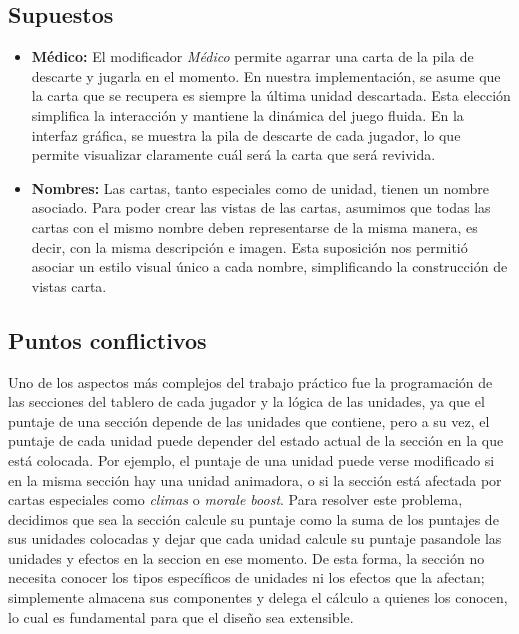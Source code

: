 \documentclass[titlepage,a4paper]{article}
\begin{document}
	\subsection{Supuestos}\label{sup:intro}
	\begin{itemize}
		\item \textbf{Médico:} El modificador \textit{Médico} permite agarrar una carta de la pila de descarte y jugarla en el momento.
		En nuestra implementación, se asume que la carta que se recupera es siempre la última unidad descartada. Esta elección simplifica la interacción y mantiene la dinámica del juego fluida. En la interfaz gráfica, se muestra la pila de descarte de cada jugador, lo que permite visualizar claramente cuál será la carta que será revivida.

		\item \textbf{Nombres:} Las cartas, tanto especiales como de unidad, tienen un nombre asociado. Para poder crear las vistas de las cartas, asumimos que todas las cartas con el mismo nombre deben representarse de la misma manera, es decir, con la misma descripción e imagen. Esta suposición nos permitió asociar un estilo visual único a cada nombre, simplificando la construcción de vistas carta.

	\end{itemize}

	\subsection{Puntos conflictivos}\label{sup:conflicto}

	Uno de los aspectos más complejos del trabajo práctico fue la programación de las secciones del tablero de cada jugador y la lógica de las unidades, ya que el puntaje de una sección depende de las unidades que contiene, pero a su vez, el puntaje de cada unidad puede depender del estado actual de la sección en la que está colocada.
	Por ejemplo, el puntaje de una unidad puede verse modificado si en la misma sección hay una unidad animadora, o si la sección está afectada por cartas especiales como \textit{climas} o \textit{morale boost}.
	Para resolver este problema, decidimos que sea la sección calcule su puntaje como la suma de los puntajes de sus unidades colocadas y dejar que cada unidad calcule su puntaje pasandole las unidades y efectos en la seccion en ese momento.
	De esta forma, la sección no necesita conocer los tipos específicos de unidades ni los efectos que la afectan; simplemente almacena sus componentes y delega el cálculo a quienes los conocen, lo cual es fundamental para que el diseño sea extensible.
\end{document}
